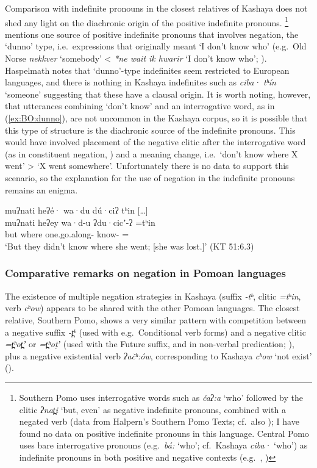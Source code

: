 \documentclass[output=paper,modfonts,nonflat,colorlinks,citecolor=brown]{langscibook}
\begin{document}
Comparison with indefinite pronouns in the closest relatives of Kashaya does not shed any light on the diachronic origin of the positive indefinite pronouns.%
\footnote{%
Southern Pomo uses interrogative words such as \textit{čaʔ:a} `who' followed by the clitic \textit{ʔnat̪i} `but, even' as negative indefinite pronouns, combined with a negated verb (data from Halpern's Southern Pomo Texts; cf.\ also \citealt[259]{Walker2020}); I have found no data on positive indefinite pronouns in this language.
Central Pomo uses bare interrogative pronouns (e.g.\ \textit{bá:} `who'; cf.\ Kashaya \textit{ciba·} `who') as indefinite pronouns in both positive and negative contexts (e.g.\ \citealt[238, ex.\ 58]{Mithun2008passivization}, \citealt[83, ex.\ 15]{Mithun1998})
} %
\citet{Haspelmath1997} mentions one source of positive indefinite pronouns that involves negation, the `dunno' type, i.e.\ expressions that originally meant `I don't know who' (e.g.\ Old Norse \textit{nekkver} `somebody' < \textit{*ne wait ik hwarir} `I don't know who'; \citeyear[131]{Haspelmath1997}). Haspelmath notes that `dunno'-type indefinites seem restricted to European languages, and there is nothing in Kashaya indefinites such as \textit{ciba· tʰín} `someone' suggesting that these have a clausal origin. It is worth noting, however, that utterances combining `don't know' and an interrogative word, as in (\ref{ex:BO:dunno}), are not uncommon in the Kashaya corpus, so it is possible that this type of structure is the diachronic source of the indefinite pronouns. This would have involved placement of the negative clitic after the interrogative word (as in constituent negation, ) and a meaning change, i.e.\ `don't know where X went' > `X went somewhere'.
Unfortunately there is no data to support this scenario, so the explanation for the use of negation in the indefinite pronouns remains an enigma.

{%
\ea 
\label{ex:BO:dunno}
\glll muʔnati heʔé· wa·du dú·ciʔ tʰin [\ldots]\\
 muʔnati heʔey wa·d-u ʔdu·cicʼ-ʔ =tʰin {}\\
 but where one.go.along- know- = {}\\
\glt `But they didn’t know where she went; [she was lost.]' ({KT 51:6.3})\\
\z
}%


\subsubsection{Comparative remarks on negation in Pomoan languages}
The existence of multiple negation strategies in Kashaya (suffix \textit{-tʰ}, clitic \textit{=tʰin}, verb \textit{cʰow}) appears to be shared with the other Pomoan languages. The closest relative, Southern Pomo, shows a very similar pattern with competition between a negative suffix \textit{-t̪ʰ} (used with e.g.\ Conditional verb forms) and a negative clitic \textit{=t̪ʰot̪ʼ} or \textit{=t̪ʰoṭʼ} (used with the Future suffix, and in non-verbal predication; \citealt[246--248]{Walker2020}), plus a negative existential verb \textit{ʔačʰ:ów}, corresponding to Kashaya \textit{cʰow} `not exist' (\citealt[308]{Walker2020}).
\end{document}
